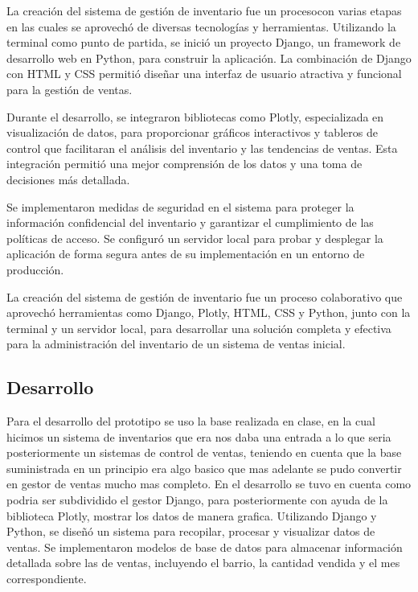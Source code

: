 \documentclass[conference]{IEEEtran}
\begin{document}
La creación del sistema de gestión de inventario fue un procesocon varias etapas en las cuales se aprovechó de diversas tecnologías y herramientas. Utilizando la terminal como punto de partida, se inició un proyecto Django, un framework de desarrollo web en Python, para construir la aplicación. La combinación de Django con HTML y CSS permitió diseñar una interfaz de usuario atractiva y funcional para la gestión de ventas.

Durante el desarrollo, se integraron bibliotecas como Plotly, especializada en visualización de datos, para proporcionar gráficos interactivos y tableros de control que facilitaran el análisis del inventario y las tendencias de ventas. Esta integración permitió una mejor comprensión de los datos y una toma de decisiones más detallada.

Se implementaron medidas de seguridad en el sistema para proteger la información confidencial del inventario y garantizar el cumplimiento de las políticas de acceso. Se configuró un servidor local para probar y desplegar la aplicación de forma segura antes de su implementación en un entorno de producción.

La creación del sistema de gestión de inventario fue un proceso colaborativo que aprovechó herramientas como Django, Plotly, HTML, CSS y Python, junto con la terminal y un servidor local, para desarrollar una solución completa y efectiva para la administración del inventario de un sistema de ventas inicial.

\subsection{Desarrollo}

Para el desarrollo del prototipo se uso la base realizada en clase, en la cual hicimos un sistema de inventarios que era nos daba una entrada a lo que seria posteriormente un sistemas de control de ventas, teniendo en cuenta que la base suministrada en un principio era algo basico que mas adelante se pudo convertir en gestor de ventas mucho mas completo. 
En el desarrollo se tuvo en cuenta como podria ser subdividido el gestor Django, para posteriormente con ayuda de la biblioteca Plotly, mostrar los datos de manera grafica. Utilizando Django y Python, se diseñó un sistema para recopilar, procesar y visualizar datos de ventas. Se implementaron modelos de base de datos para almacenar información detallada sobre las de ventas, incluyendo el barrio, la cantidad vendida y el mes correspondiente.
\end{document}
